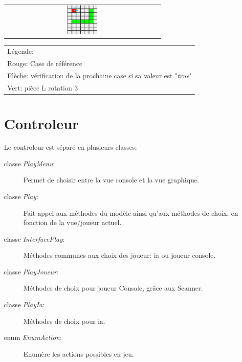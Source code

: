                 \begin{table}[h]\label{img:prblmPlacementPiece}
                    \begin{tabular}{c}
                        \includegraphics[width=0.20\textwidth, keepaspectratio]{img/pieceLposY.png}
                    \end{tabular}
                    \begin{tabular}{l}
                        {\small Légende:}\\
                        {\small Rouge: Case de référence}\\
                        {\small Flèche: vérification de la prochaine case si sa valeur est "\textit{true}"}\\
                        {\small Vert: pièce L rotation 3}\\
                    \end{tabular}
               \end{table}


      \section{Controleur}

        Le controleur est séparé en plusieurs classes:
        \begin{description}
            \item[classe \textit{PlayMenu}:]{Permet de choisir entre la vue console et la vue graphique.}
            \item[classe \textit{Play}:]{Fait appel aux méthodes du modèle ainsi qu'aux méthodes de choix, en fonction de la vue/joueur actuel.}
            \item[classe \textit{InterfacePlay}:]{Méthodes communes aux choix des joueur: ia ou joueur console.}
            \item[classe \textit{PlayJoueur}:]{Méthodes de choix pour joueur Console, grâce aux Scanner.}
            \item[classe \textit{PlayIa}:]{Méthodes de choix pour ia.}
            \item[enum \textit{EnumAction}:]{Enumère les actions possibles en jeu.}
		\end{description}


